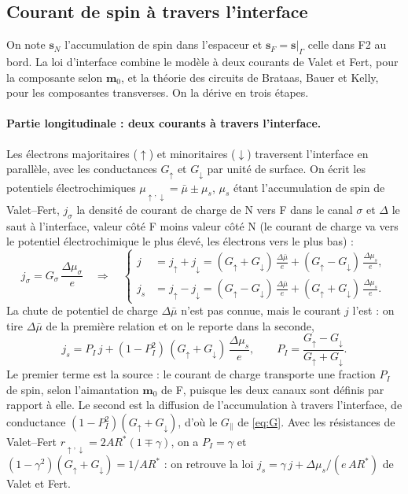 \documentclass[11pt,a4paper]{article}
\newcommand{\vm}{\bm{m}}
\newcommand{\vs}{\bm{s}}
\begin{document}
\subsection{Courant de spin à travers l'interface}

On note $\vs_N$ l'accumulation de spin dans l'espaceur et
$\vs_F = \vs|_\Gamma$ celle dans F2 au bord. La loi d'interface combine le
modèle à deux courants de Valet et Fert, pour la composante selon
$\vm_0$, et la théorie des circuits de Brataas, Bauer et Kelly, pour les
composantes transverses. On la dérive en trois étapes.

\paragraph{Partie longitudinale : deux courants à travers l'interface.}
Les électrons majoritaires ($\uparrow$) et minoritaires ($\downarrow$)
traversent l'interface en parallèle, avec les conductances $G_\uparrow$ et
$G_\downarrow$ par unité de surface. On écrit les potentiels
électrochimiques $\mu_{\uparrow,\downarrow} = \bar\mu\pm\mu_s$, $\mu_s$ étant
l'accumulation de spin de Valet--Fert, $j_\sigma$ la densité de courant
de charge de N vers F dans le canal $\sigma$ et $\Delta$ le saut à
l'interface, valeur côté F moins valeur côté N (le courant de charge va
vers le potentiel électrochimique le plus élevé, les électrons vers le plus
bas) :
\begin{equation}
  j_\sigma = G_\sigma\,\frac{\Delta\mu_\sigma}{e}
  \quad\Rightarrow\quad
  \left\{
  \begin{aligned}
    j &= j_\uparrow+j_\downarrow
       = (G_\uparrow+G_\downarrow)\,\frac{\Delta\bar\mu}{e}
       + (G_\uparrow-G_\downarrow)\,\frac{\Delta\mu_s}{e},\\
    j_s &= j_\uparrow-j_\downarrow
       = (G_\uparrow-G_\downarrow)\,\frac{\Delta\bar\mu}{e}
       + (G_\uparrow+G_\downarrow)\,\frac{\Delta\mu_s}{e}.
  \end{aligned}
  \right.
\end{equation}
La chute de potentiel de charge $\Delta\bar\mu$ n'est pas connue, mais le
courant $j$ l'est : on tire $\Delta\bar\mu$ de la première relation et on
le reporte dans la seconde,
\begin{equation}
  j_s = P_I\,j + (1-P_I^2)\,(G_\uparrow+G_\downarrow)\,\frac{\Delta\mu_s}{e},
  \qquad
  P_I = \frac{G_\uparrow-G_\downarrow}{G_\uparrow+G_\downarrow}.
  \label{eq:robin-long}
\end{equation}
Le premier terme est la source : le courant de charge transporte une
fraction $P_I$ de spin, selon l'aimantation $\vm_0$ de F, puisque les deux
canaux sont définis par rapport à elle. Le second est la diffusion de
l'accumulation à travers l'interface, de conductance
$(1-P_I^2)(G_\uparrow+G_\downarrow)$, d'où le $G_\parallel$ de
\eqref{eq:G}. Avec les résistances de Valet--Fert
$r_{\uparrow,\downarrow} = 2AR^*(1\mp\gamma)$, on a $P_I = \gamma$ et
$(1-\gamma^2)(G_\uparrow+G_\downarrow) = 1/AR^*$ : on retrouve la loi
$j_s = \gamma\,j + \Delta\mu_s/(e\,AR^*)$ de Valet et Fert.
\end{document}
